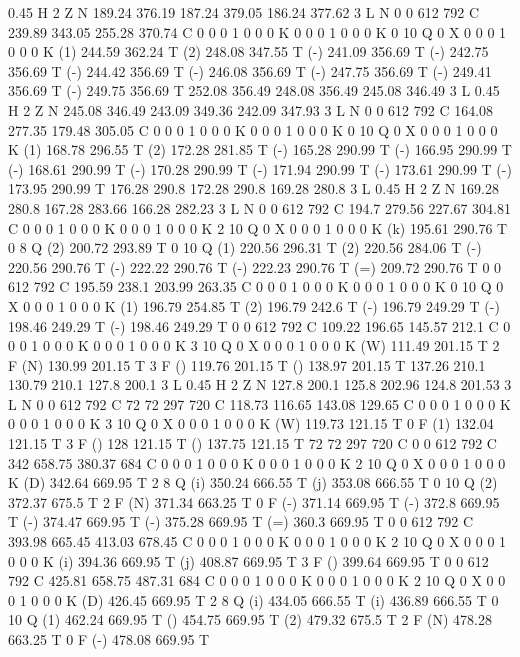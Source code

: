 0.45 H
2 Z
N
189.24 376.19 187.24 379.05 186.24 377.62 3 L
N
0 0 612 792 C
239.89 343.05 255.28 370.74 C
0 0 0 1 0 0 0 K
0 0 0 1 0 0 0 K
0 10 Q
0 X
0 0 0 1 0 0 0 K
(1) 244.59 362.24 T
(2) 248.08 347.55 T
(-) 241.09 356.69 T
(-) 242.75 356.69 T
(-) 244.42 356.69 T
(-) 246.08 356.69 T
(-) 247.75 356.69 T
(-) 249.41 356.69 T
(-) 249.75 356.69 T
252.08 356.49 248.08 356.49 245.08 346.49 3 L
0.45 H
2 Z
N
245.08 346.49 243.09 349.36 242.09 347.93 3 L
N
0 0 612 792 C
164.08 277.35 179.48 305.05 C
0 0 0 1 0 0 0 K
0 0 0 1 0 0 0 K
0 10 Q
0 X
0 0 0 1 0 0 0 K
(1) 168.78 296.55 T
(2) 172.28 281.85 T
(-) 165.28 290.99 T
(-) 166.95 290.99 T
(-) 168.61 290.99 T
(-) 170.28 290.99 T
(-) 171.94 290.99 T
(-) 173.61 290.99 T
(-) 173.95 290.99 T
176.28 290.8 172.28 290.8 169.28 280.8 3 L
0.45 H
2 Z
N
169.28 280.8 167.28 283.66 166.28 282.23 3 L
N
0 0 612 792 C
194.7 279.56 227.67 304.81 C
0 0 0 1 0 0 0 K
0 0 0 1 0 0 0 K
2 10 Q
0 X
0 0 0 1 0 0 0 K
(k) 195.61 290.76 T
0 8 Q
(2) 200.72 293.89 T
0 10 Q
(1) 220.56 296.31 T
(2) 220.56 284.06 T
(-) 220.56 290.76 T
(-) 222.22 290.76 T
(-) 222.23 290.76 T
(=) 209.72 290.76 T
0 0 612 792 C
195.59 238.1 203.99 263.35 C
0 0 0 1 0 0 0 K
0 0 0 1 0 0 0 K
0 10 Q
0 X
0 0 0 1 0 0 0 K
(1) 196.79 254.85 T
(2) 196.79 242.6 T
(-) 196.79 249.29 T
(-) 198.46 249.29 T
(-) 198.46 249.29 T
0 0 612 792 C
109.22 196.65 145.57 212.1 C
0 0 0 1 0 0 0 K
0 0 0 1 0 0 0 K
3 10 Q
0 X
0 0 0 1 0 0 0 K
(W) 111.49 201.15 T
2 F
(N) 130.99 201.15 T
3 F
() 119.76 201.15 T
() 138.97 201.15 T
137.26 210.1 130.79 210.1 127.8 200.1 3 L
0.45 H
2 Z
N
127.8 200.1 125.8 202.96 124.8 201.53 3 L
N
0 0 612 792 C
72 72 297 720 C
118.73 116.65 143.08 129.65 C
0 0 0 1 0 0 0 K
0 0 0 1 0 0 0 K
3 10 Q
0 X
0 0 0 1 0 0 0 K
(W) 119.73 121.15 T
0 F
(1) 132.04 121.15 T
3 F
() 128 121.15 T
() 137.75 121.15 T
72 72 297 720 C
0 0 612 792 C
342 658.75 380.37 684 C
0 0 0 1 0 0 0 K
0 0 0 1 0 0 0 K
2 10 Q
0 X
0 0 0 1 0 0 0 K
(D) 342.64 669.95 T
2 8 Q
(i) 350.24 666.55 T
(j) 353.08 666.55 T
0 10 Q
(2) 372.37 675.5 T
2 F
(N) 371.34 663.25 T
0 F
(-) 371.14 669.95 T
(-) 372.8 669.95 T
(-) 374.47 669.95 T
(-) 375.28 669.95 T
(=) 360.3 669.95 T
0 0 612 792 C
393.98 665.45 413.03 678.45 C
0 0 0 1 0 0 0 K
0 0 0 1 0 0 0 K
2 10 Q
0 X
0 0 0 1 0 0 0 K
(i) 394.36 669.95 T
(j) 408.87 669.95 T
3 F
() 399.64 669.95 T
0 0 612 792 C
425.81 658.75 487.31 684 C
0 0 0 1 0 0 0 K
0 0 0 1 0 0 0 K
2 10 Q
0 X
0 0 0 1 0 0 0 K
(D) 426.45 669.95 T
2 8 Q
(i) 434.05 666.55 T
(i) 436.89 666.55 T
0 10 Q
(1) 462.24 669.95 T
() 454.75 669.95 T
(2) 479.32 675.5 T
2 F
(N) 478.28 663.25 T
0 F
(-) 478.08 669.95 T
